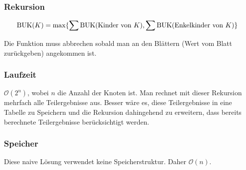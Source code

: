 \documentclass[ngerman,a4paper]{report}
\begin{document}
\subsubsection*{Rekursion}
\begin{align*}
\text{\lstinline!BUK!}(K) = \max \{ \sum \text{\lstinline!BUK!(Kinder von $K$)}, \sum \text{\lstinline!BUK!(Enkelkinder von $K$)} \}
\end{align*}

Die Funktion muss abbrechen sobald man an den Blättern (Wert vom Blatt zurückgeben) angekommen ist.

\subsubsection*{Laufzeit}
$\mathcal{O}(2^n)$, wobei $n$ die Anzahl der Knoten ist. Man rechnet mit dieser Rekursion mehrfach alle Teilergebnisse aus. Besser wäre es, diese Teilergebnisse in eine Tabelle zu Speichern und die Rekursion dahingehend zu erweitern, dass bereits berechnete Teilergebnisse berücksichtigt werden.

\subsubsection*{Speicher}
Diese naive Lösung verwendet keine Speicherstruktur. Daher $\mathcal{O}(n)$.
\end{document}
